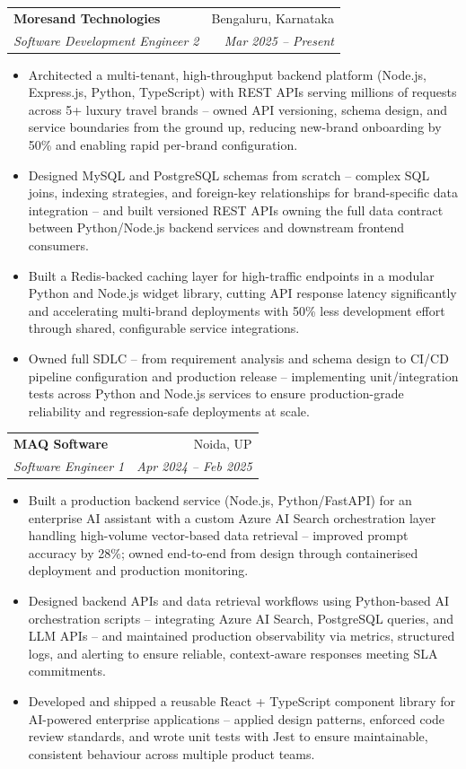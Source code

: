 \documentclass[a4paper,20pt]{article}
\makeatletter
\newcommand{\resumeSubheading}[4]{\vspace{-1pt}\item\begin{tabular*}{0.97\textwidth}{l@{\extracolsep{\fill}}r}\textbf{#1} & #2 \\\textit{#3} & \textit{#4} \\\end{tabular*}\vspace{-5pt}}
\newcommand{\resumeItemListStart}{\begin{itemize}}
\newcommand{\resumeItemListEnd}{\end{itemize}\vspace{-5pt}}
\makeatother
\begin{document}
    \resumeSubheading
      {Moresand Technologies}{Bengaluru, Karnataka}
      {Software Development Engineer 2}{Mar 2025 -- Present}
      \resumeItemListStart
        \item\small{Architected a multi-tenant, high-throughput backend platform (Node.js, Express.js, Python, TypeScript) with REST APIs serving millions of requests across 5+ luxury travel brands -- owned API versioning, schema design, and service boundaries from the ground up, reducing new-brand onboarding by 50\% and enabling rapid per-brand configuration.}
        \item\small{Designed MySQL and PostgreSQL schemas from scratch -- complex SQL joins, indexing strategies, and foreign-key relationships for brand-specific data integration -- and built versioned REST APIs owning the full data contract between Python/Node.js backend services and downstream frontend consumers.}
        \item\small{Built a Redis-backed caching layer for high-traffic endpoints in a modular Python and Node.js widget library, cutting API response latency significantly and accelerating multi-brand deployments with 50\% less development effort through shared, configurable service integrations.}
        \item\small{Owned full SDLC -- from requirement analysis and schema design to CI/CD pipeline configuration and production release -- implementing unit/integration tests across Python and Node.js services to ensure production-grade reliability and regression-safe deployments at scale.}
      \resumeItemListEnd

    \resumeSubheading
      {MAQ Software}{Noida, UP}
      {Software Engineer 1}{Apr 2024 -- Feb 2025}
      \resumeItemListStart
        \item\small{Built a production backend service (Node.js, Python/FastAPI) for an enterprise AI assistant with a custom Azure AI Search orchestration layer handling high-volume vector-based data retrieval -- improved prompt accuracy by 28\%; owned end-to-end from design through containerised deployment and production monitoring.}
        \item\small{Designed backend APIs and data retrieval workflows using Python-based AI orchestration scripts -- integrating Azure AI Search, PostgreSQL queries, and LLM APIs -- and maintained production observability via metrics, structured logs, and alerting to ensure reliable, context-aware responses meeting SLA commitments.}
        \item\small{Developed and shipped a reusable React + TypeScript component library for AI-powered enterprise applications -- applied design patterns, enforced code review standards, and wrote unit tests with Jest to ensure maintainable, consistent behaviour across multiple product teams.}
      \resumeItemListEnd
\end{document}
